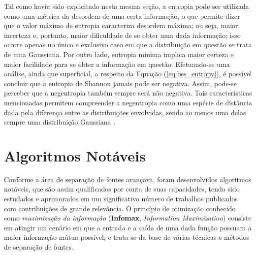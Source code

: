 Tal como havia sido explicitado nesta mesma seção, a entropia pode ser utilizada como uma métrica da desordem de uma certa informação, o que permite dizer que o valor máximo de entropia caracteriza desordem máxima; ou seja, maior incerteza e, portanto, maior dificuldade de se obter uma dada informação; isso ocorre apenas no único e exclusivo caso em que a distribuição em questão se trata de uma Gaussiana. Por outro lado, entropia mínima implica maior certeza e maior facilidade para se obter a informação em questão. Efetuando-se uma análise, ainda que superficial, a respeito da Equação (\ref{eq:bss_entropy}), é possível concluir que a entropia de Shannon jamais pode ser negativa. Assim, pode-se perceber que a negentropia também sempre será não negativa. Tais características mencionadas permitem compreender a negentropia como uma espécie de distância dada pela diferença entre as distribuições envolvidas, sendo ao menos uma delas sempre uma distribuição Gaussiana \citep{suyama2007proposta}.







\section{Algoritmos Notáveis}
\label{sec:bss_algorithms}

Conforme a área de separação de fontes avançava, foram desenvolvidos algoritmos notáveis, que são assim qualificados por conta de suas capacidades, tendo sido estudados e aprimorados em um significativo número de trabalhos publicados com contribuições de grande relevância. O princípio de otimização conhecido como \textit{maximização da informação} (\textbf{Infomax}, \textit{Information Maximization}) \citep{linsker1988self} consiste em atingir um cenário em que a entrada e a saída de uma dada função possuam a maior informação mútua possível, e trata-se da base de várias técnicas e métodos de separação de fontes.

